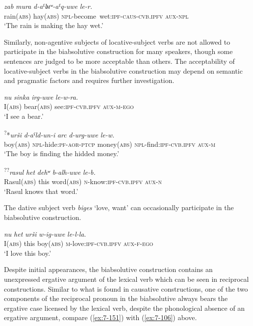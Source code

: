 ﻿\documentclass[output=paper]{langsci/langscibook}
\begin{document}
\ex %
\gll *\emph{zab} \emph{mura} \emph{d-aˤlʜʷ-aˤq-uwe} \emph{le-r.}\\
rain(\textsc{abs}) hay(\textsc{abs}) \textsc{npl}-become~wet:\textsc{ipf}-\textsc{caus}-\textsc{cvb.ipfv} \textsc{aux}-\textsc{npl}\\
\glt `The rain is making the hay wet.'
\z

Similarly, non-agentive subjects of locative-subject verbs are not
allowed to participate in the biabsolutive construction for many
speakers, though some sentences are judged to be more acceptable than others. The
acceptability of locative-subject verbs in the biabsolutive
construction may depend on semantic and pragmatic factors and requires
further investigation.

\ea %
\gll *\emph{nu} \emph{sinka} \emph{irg-uwe} \emph{le-w-ra.}\\
I(\textsc{abs}) bear(\textsc{abs}) see:\textsc{ipf}-\textsc{cvb.ipfv} \textsc{aux}-\textsc{m}-\textsc{ego}\\
\glt `I see a bear.'

\ex %
\gll \textsuperscript{?}*\emph{urši} \emph{d-aˤld-un-i} \emph{arc} \emph{d-urg-uwe} \emph{le-w.}\\
boy(\textsc{abs}) \textsc{npl}-hide:\textsc{pf}-\textsc{aor}-\textsc{ptcp} money(\textsc{abs}) \textsc{npl}-find:\textsc{ipf}-\textsc{cvb.ipfv} \textsc{aux}-\textsc{m}\\
\glt `The boy is finding the hidded money.'

\ex %
\gll \textsuperscript{??}\emph{rasul} \emph{het} \emph{dehʷ} \emph{b-alh-uwe} \emph{le-b.}\\
Rasul(\textsc{abs}) {this} word(\textsc{abs}) \textsc{n}-know:\textsc{ipf}-\textsc{cvb.ipfv} \textsc{aux}-\textsc{n}\\
\glt `Rasul knows that word.'
\z

The dative subject verb \emph{biges} `love, want' can occasionally
participate in the biabsolutive construction.

\ea %
\gll \emph{nu} \emph{het} \emph{urši} \emph{w-ig-uwe} \emph{le-l-la}.\\
I(\textsc{abs}) {this} boy(\textsc{abs}) \textsc{m}-love:\textsc{ipf}-\textsc{cvb.ipfv} \textsc{aux}-\textsc{f}-\textsc{ego}\\
\glt `I love this boy.'
\z

Despite initial appearances, the biabsolutive construction contains an
unexpressed ergative argument of the lexical verb which can be seen in
reciprocal constructions. Similar to what is found in causative
constructions, one of the two components of the reciprocal pronoun in
the biabsolutive always bears the ergative case licensed by the lexical
verb, despite the phonological absence of an ergative argument, compare
(\ref{ex:7-151}) with (\ref{ex:7-106}) above.
\end{document}
